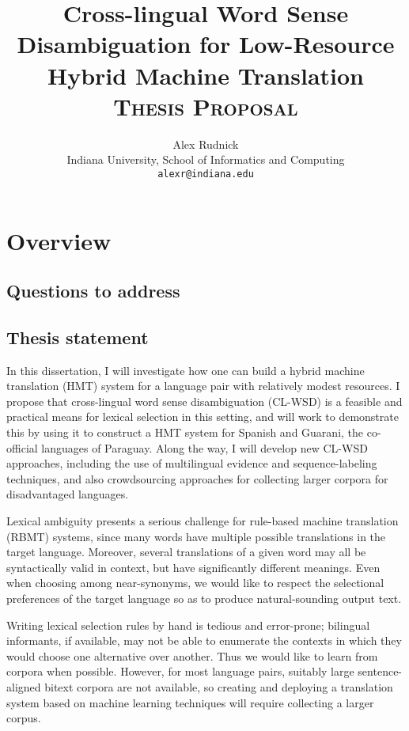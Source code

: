 \documentclass{article}
\title{Cross-lingual Word Sense Disambiguation for Low-Resource Hybrid Machine
Translation
  \\ \vspace{2 mm}
  {\Large \textsc{Thesis Proposal}}
}
\author{Alex Rudnick \\
	    Indiana University, School of Informatics and Computing \\
	    {\tt alexr@indiana.edu}}
\date{}
\begin{document}
\maketitle

\section{Overview}

\subsection{Questions to address}

\subsection{Thesis statement}


In this dissertation, I will investigate how one can build a hybrid machine
translation (HMT) system for a language pair with relatively modest resources.
I propose that cross-lingual word sense disambiguation (CL-WSD) is a
feasible and practical means for lexical selection in this setting, and will work to
demonstrate this by using it to construct a HMT system for
Spanish and Guarani, the co-official languages of Paraguay.
Along the way, I will develop new CL-WSD approaches, including the use of
multilingual evidence and sequence-labeling techniques, and also crowdsourcing
approaches for collecting larger corpora for disadvantaged languages.

Lexical ambiguity presents a serious challenge for rule-based machine
translation (RBMT) systems, since many words have multiple possible
translations in the target language. Moreover, several translations of a given
word may all be syntactically valid in context, but have significantly
different meanings. Even when choosing among near-synonyms, we would like to
respect the selectional preferences of the target language so as to produce
natural-sounding output text.

Writing lexical selection rules by hand is tedious and error-prone; bilingual
informants, if available, may not be able to enumerate the contexts in which
they would choose one alternative over another. Thus we would like to learn
from corpora when possible. However, for most language pairs, suitably large
sentence-aligned bitext corpora are not available, so creating and deploying a
translation system based on machine learning techniques will require collecting
a larger corpus.
\end{document}

